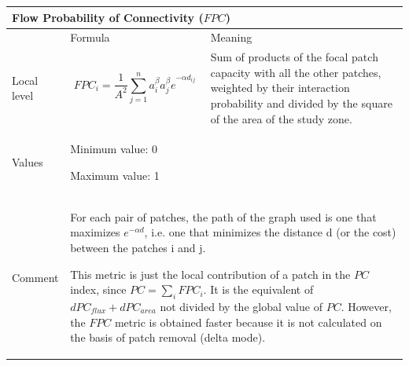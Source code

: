 \documentclass{article}
\begin{document}
\begin{table}[H]
\begin{tabular}{|m{3.24cm}|m{4.4810004cm}m{7.924cm}|}
\hline
\multicolumn{3}{|m{16.044998cm}|}{Flow Probability of Connectivity
($FPC$)}\\\hline
 &
\multicolumn{1}{m{4.4810004cm}|}{Formula} &
Meaning\\\hline
Local level &
\multicolumn{1}{m{4.4810004cm}|}{\begin{equation*}
{\mathit{FPC}}_{i}=\frac{1}{{A}^{2}}\sum _{j=1}^{n}{{{a}_{i}^{\beta
}{a}_{j}^{\beta }e}^{-\alpha {d}_{\mathit{ij}}}}
\end{equation*}
} &
Sum of products of the focal patch capacity with all the other patches,
weighted by their interaction probability and divided by the square of
the area of the study zone.\\\hline
Values &
\multicolumn{2}{m{12.6050005cm}|}{
Minimum value: 0

Maximum value: 1
}\\\hline
Comment &
\multicolumn{2}{m{12.6050005cm}|}{For each pair of patches, the path of
the graph used is one that maximizes ${e}^{-\mathit{\alpha d}}$, i.e.
one that minimizes the distance d (or the cost) between the patches i
and j.

This metric is just the local contribution of a patch in the $PC$ index,
since  $\mathit{PC}=\sum _{i}{{\mathit{FPC}}_{i}}$. It is the
equivalent of ${dPC}_{flux}+{dPC}_{area}$ not divided
by the global value of $PC$. However, the $FPC$ metric is obtained faster because it is not calculated on the basis of patch removal (delta mode).
}\\\hline
\end{tabular}
\end{table}
\end{document}
